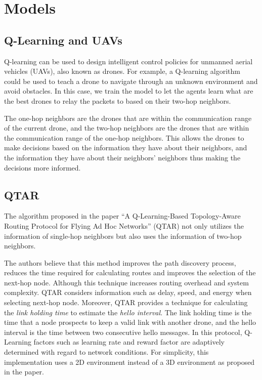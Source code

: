 \section{Models}

\subsection{Q-Learning and UAVs}
Q-learning can be used to design intelligent control policies for unmanned aerial vehicles (UAVs), also known as drones.
For example, a Q-learning algorithm could be used to teach a drone to navigate through an unknown environment and avoid obstacles.
In this case, we train the model to let the agents learn what are the best drones to relay the packets to based on their two-hop neighbors.

The one-hop neighbors are the drones that are within the communication range of the current drone, and the two-hop neighbors are the
drones that are within the communication range of the one-hop neighbors. This allows the drones to make decisions based on the information
they have about their neighbors, and the information they have about their neighbors' neighbors thus making the decisions more informed.

\subsection{QTAR}
The algorithm proposed in the paper ``A Q-Learning-Based Topology-Aware Routing Protocol for Flying Ad Hoc Networks'' (QTAR)
not only utilizes the information of single-hop neighbors
but also uses the information of two-hop neighbors.

The authors believe that this method improves the path discovery process,
reduces the time required for calculating routes and improves the selection of the next-hop node.
Although this technique increases routing overhead and system complexity.
QTAR considers information such as delay, speed, and energy when selecting next-hop node. Moreover, QTAR provides a technique for calculating
the \textit{link holding time} to estimate the \textit{hello interval}.
The link holding time is the time that a node prospects to keep a valid link with another drone, and the hello interval is the time between two consecutive hello messages.
In this protocol, Q-Learning factors such as learning rate and reward factor are adaptively determined with regard to network conditions.
For simplicity, this implementation uses a 2D environment instead of a 3D environment as proposed in the paper.

